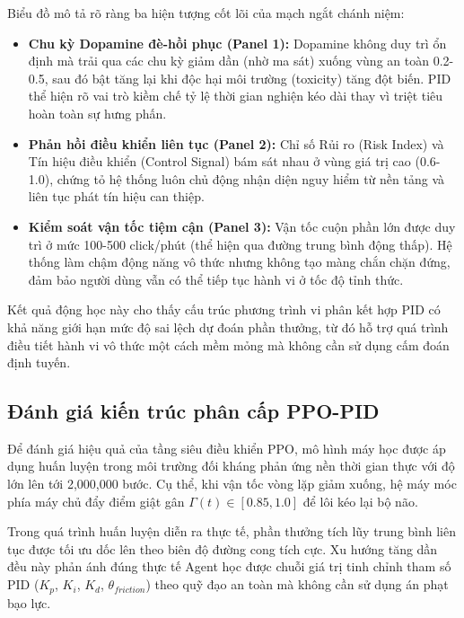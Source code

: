 Biểu đồ mô tả rõ ràng ba hiện tượng cốt lõi của mạch ngắt chánh niệm:
\begin{itemize}
    \item \textbf{Chu kỳ Dopamine đè-hồi phục (Panel 1):} Dopamine không duy trì ổn định mà trải qua các chu kỳ giảm dần (nhờ ma sát) xuống vùng an toàn 0.2-0.5, sau đó bật tăng lại khi độc hại môi trường (toxicity) tăng đột biến. PID thể hiện rõ vai trò kiềm chế tỷ lệ thời gian nghiện kéo dài thay vì triệt tiêu hoàn toàn sự hưng phấn.
    \item \textbf{Phản hồi điều khiển liên tục (Panel 2):} Chỉ số Rủi ro (Risk Index) và Tín hiệu điều khiển (Control Signal) bám sát nhau ở vùng giá trị cao (0.6-1.0), chứng tỏ hệ thống luôn chủ động nhận diện nguy hiểm từ nền tảng và liên tục phát tín hiệu can thiệp.
    \item \textbf{Kiểm soát vận tốc tiệm cận (Panel 3):} Vận tốc cuộn phần lớn được duy trì ở mức 100-500 click/phút (thể hiện qua đường trung bình động thấp). Hệ thống làm chậm động năng vô thức nhưng không tạo màng chắn chặn đứng, đảm bảo người dùng vẫn có thể tiếp tục hành vi ở tốc độ tỉnh thức.
\end{itemize}

Kết quả động học này cho thấy cấu trúc phương trình vi phân kết hợp PID có khả năng giới hạn mức độ sai lệch dự đoán phần thưởng, từ đó hỗ trợ quá trình điều tiết hành vi vô thức một cách mềm mỏng mà không cần sử dụng cấm đoán định tuyến.

\subsection{Đánh giá kiến trúc phân cấp PPO-PID}

Để đánh giá hiệu quả của tầng siêu điều khiển PPO, mô hình máy học được áp dụng huấn luyện trong môi trường đối kháng phản ứng nền thời gian thực với độ lớn lên tới 2,000,000 bước. Cụ thể, khi vận tốc vòng lặp giảm xuống, hệ máy móc phía máy chủ đẩy điểm giật gân $\Gamma(t) \in [0.85, 1.0]$ để lôi kéo lại bộ não.

Trong quá trình huấn luyện diễn ra thực tế, phần thưởng tích lũy trung bình liên tục được tối ưu dốc lên theo biên độ đường cong tích cực. Xu hướng tăng dần đều này phản ánh đúng thực tế Agent học được chuỗi giá trị tinh chỉnh tham số PID ($K_p$, $K_i$, $K_d$, $\theta_{friction}$) theo quỹ đạo an toàn mà không cần sử dụng án phạt bạo lực.

